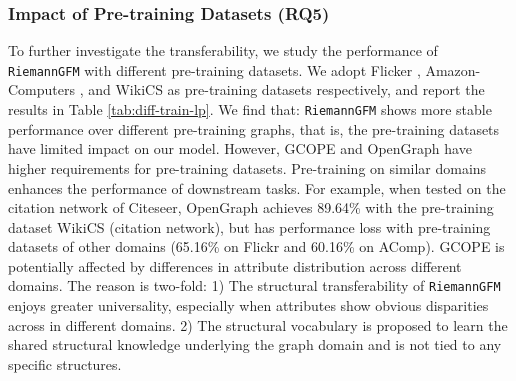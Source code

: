 \subsubsection{\textbf{Impact of Pre-training Datasets (RQ5)}}
To further investigate the transferability, we study the performance of \texttt{RiemannGFM} with different pre-training datasets.
We adopt Flicker \cite{flickr}, Amazon-Computers \cite{physics_computers}, and WikiCS \cite{wikics} as pre-training datasets respectively, and report the results in Table \ref{tab:diff-train-lp}. We find that: 
\texttt{RiemannGFM} shows more stable performance over different pre-training graphs, that is, the pre-training datasets have limited impact on our model.
However, GCOPE and OpenGraph have higher requirements for pre-training datasets.
Pre-training on similar domains enhances the performance of downstream tasks. For example, when tested on the citation network of Citeseer, OpenGraph achieves 89.64\% with the pre-training dataset WikiCS (citation network),  but has performance loss with pre-training datasets of other domains (65.16\% on Flickr and 60.16\% on AComp).
GCOPE is potentially affected by differences in attribute distribution across different domains.
The reason is two-fold: 
1) The structural transferability of  \texttt{RiemannGFM} enjoys greater universality, especially when attributes show obvious disparities across in different domains.
2) The structural vocabulary is proposed to learn the shared structural knowledge underlying the graph domain and is not tied to any specific structures.


